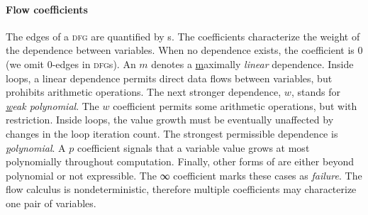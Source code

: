 \paragraph*{Flow coefficients}
The edges of a \textsc{dfg} are quantified by {s}. The
coefficients characterize the weight of the dependence between variables. When
no dependence exists, the coefficient is \(0\) (we omit \(0\)-edges
in \textsc{dfg}s). An \(m\) denotes a
\underline{m}aximally \emph{linear} dependence. Inside loops, a linear
dependence permits direct data flows between variables, but prohibits arithmetic
operations. The next stronger dependence, \(w\), stands for
\emph{\underline{w}eak polynomial}. The \(w\) coefficient permits some
arithmetic operations, but with restriction. Inside loops, the value growth must
be eventually unaffected by changes in the loop iteration count. The strongest
permissible dependence is \emph{\underline{p}olynomial}. A \(p\)
coefficient signals that a variable value grows at most polynomially throughout
computation. Finally, other forms of  are either beyond
polynomial or not expressible. The ∞ coefficient marks these cases
as \emph{failure}. The flow calculus is
nondeterministic, therefore multiple coefficients may
characterize one pair of variables.


